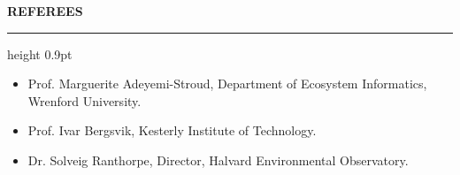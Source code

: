 \documentclass[10pt,a4paper]{article}
\newcommand{\cvsection}[1]{%
  \vspace{10pt}%
  {\normalsize\bfseries\MakeUppercase{#1}}%
  \vspace{2pt}\hrule height 0.9pt%
  \vspace{6pt}%
}
\begin{document}
\cvsection{Referees}

\begin{itemize}[leftmargin=1.2em,itemsep=3pt,topsep=2pt]
  \item Prof. Marguerite Adeyemi-Stroud, Department of Ecosystem Informatics, Wrenford University.
  \item Prof. Ivar Bergsvik, Kesterly Institute of Technology.
  \item Dr. Solveig Ranthorpe, Director, Halvard Environmental Observatory.
\end{itemize}

\label{cv:end}
\end{document}
